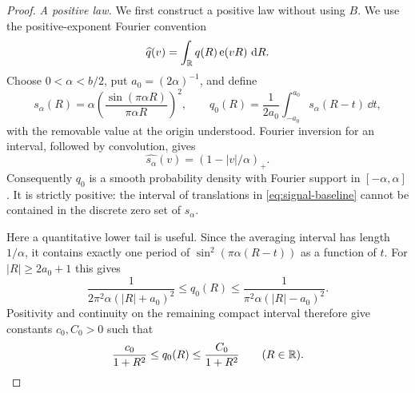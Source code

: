 \begin{proof}
\emph{A positive law.}
We first construct a positive law without using $B$.  We use the
positive-exponent Fourier convention
\[
 \widehat q(v)=\int_\mathbb R q(R)\operatorname{e}(vR)\,\,\mathrm d R.
\]
Choose $0<\alpha<b/2$, put $a_0=(2\alpha)^{-1}$, and define
\begin{equation}
 s_\alpha(R)=\alpha\left(\frac{\sin(\pi\alpha R)}
                                      {\pi\alpha R}\right)^2,
 \qquad
 q_0(R)=\frac1{2a_0}\int_{-a_0}^{a_0}s_\alpha(R-t)\,\dd t,
 \label{eq:signal-baseline}
\end{equation}
with the removable value at the origin understood.  Fourier inversion
for an interval, followed by convolution, gives
\[
 \widehat{s_\alpha}(v)=(1-|v|/\alpha)_+.
\]
Consequently $q_0$ is a smooth probability density with Fourier support
in $[-\alpha,\alpha]$.  It is strictly positive: the interval of
translations in \eqref{eq:signal-baseline} cannot be contained in the
discrete zero set of $s_\alpha$.

Here a quantitative lower tail is useful.  Since the averaging interval
has length $1/\alpha$, it contains exactly one period of
$\sin^2(\pi\alpha(R-t))$ as a function of $t$.  For
$|R|\ge2a_0+1$ this gives
\[
 \frac1{2\pi^2\alpha(|R|+a_0)^2}
 \le q_0(R)
 \le\frac1{\pi^2\alpha(|R|-a_0)^2}.
\]
Positivity and continuity on the remaining compact interval therefore
give constants $c_0,C_0>0$ such that
\begin{equation}
 \frac{c_0}{1+R^2}\le q_0(R)\le\frac{C_0}{1+R^2}
 \qquad(R\in\mathbb R).
 \label{eq:signal-quadratic-tails}
\end{equation}


\end{proof}
